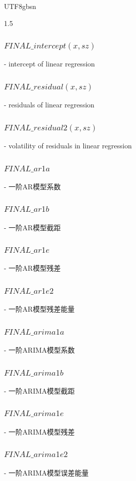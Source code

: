 \documentclass{article}
\begin{document}
\begin{CJK}{UTF8}{gbsn}
\begin{spacing}{1.5}
\subsubsection{$FINAL\_intercept(x, sz)$}             
   - intercept of linear regression
\subsubsection{$FINAL\_residual(x, sz)$}              
   - residuals of linear regression
\subsubsection{$FINAL\_residual2(x, sz)$}             
   - volatility of residuals in linear regression

\subsubsection{$FINAL\_ar1a$}
   - 一阶AR模型系数
  \subsubsection{$FINAL\_ar1b$}
   - 一阶AR模型截距
  \subsubsection{$FINAL\_ar1e$}
   - 一阶AR模型残差
  \subsubsection{$FINAL\_ar1e2$}
   - 一阶AR模型残差能量

  \subsubsection{$FINAL\_arima1a$}
   - 一阶ARIMA模型系数
  \subsubsection{$FINAL\_arima1b$}
   - 一阶ARIMA模型截距
  \subsubsection{$FINAL\_arima1e$}
   - 一阶ARIMA模型残差
  \subsubsection{$FINAL\_arima1e2$}
   - 一阶ARIMA模型误差能量




\end{spacing}
\end{CJK}
\end{document}
